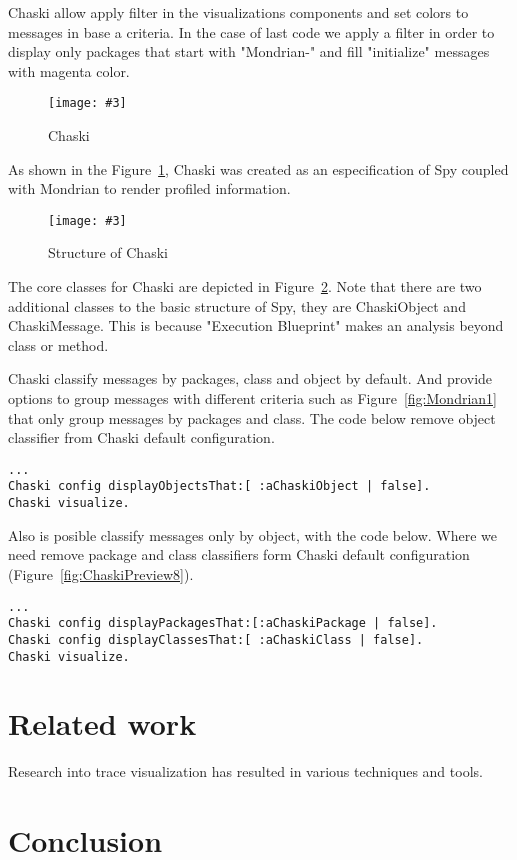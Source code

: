 \documentclass{sig-alternate}
\newcommand{\fig}[4]{
	\begin{figure}[#1]
		\centering
		\texttt{[image: \#3]}
		\caption{\label{fig:#3}#4}
	\end{figure}}
\newcommand{\seclabel}[1]{\label{sec:#1}}
\newcommand{\figref}[1]{Figure~\ref{fig:#1}}
\begin{document}
Chaski allow apply filter in the visualizations components and set colors to messages in base a criteria. In the case of last code we apply a filter in order to display only packages that start with "Mondrian-" and fill "initialize" messages with magenta color.

\fig{}{0.3}{Architecture}{Chaski}

As shown in the \figref{Architecture}, Chaski was created as an especification of Spy coupled with Mondrian to render profiled information.

\fig{}{0.5}{ObjectModel}{Structure of Chaski}

The core classes for Chaski are depicted in \figref{ObjectModel}. Note that there are two additional classes to the basic structure of Spy, they are ChaskiObject and ChaskiMessage. This is because "Execution Blueprint" makes an analysis beyond class or method.

Chaski classify messages by packages, class and object by default. And provide options to group messages with different criteria such as \figref{Mondrian1} that only group messages by packages and class. The code below remove object classifier from Chaski default configuration.
\begin{lstlisting}[language=Smalltalk]
...
Chaski config displayObjectsThat:[ :aChaskiObject | false].
Chaski visualize.
\end{lstlisting}

Also is posible classify messages only by object, with the code below. Where we need remove package and class classifiers form Chaski default configuration (\figref{ChaskiPreview8}).
\begin{lstlisting}[language=Smalltalk]
...
Chaski config displayPackagesThat:[:aChaskiPackage | false].
Chaski config displayClassesThat:[ :aChaskiClass | false].
Chaski visualize.
\end{lstlisting}

\section{Related work}\seclabel{relatedwork}

Research into trace visualization has resulted in various techniques and tools.



\section{Conclusion}\seclabel{conclusion}




\end{document}
